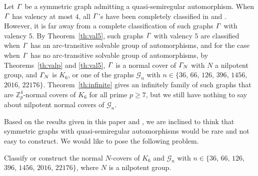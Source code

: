 \documentclass[12pt,reqno]{amsart}
\newcommand\mz{\mathbb{Z}}
\newcommand{\cG}{\mathcal{G}}
\numberwithin {equation} {section}
\begin{document}
Let ${\it \Gamma}$ be a symmetric graph admitting a quasi-semiregular automorphism. When ${\it \Gamma}$ has valency at most $4$, all ${\it \Gamma}$'s have been completely  classified in \cite{FengHKKM} and \cite{YF}. However, it is far away from a complete classification of such graphs ${\it \Gamma}$ with valency $5$. By Theorem~\ref{th:val5}, such graphs ${\it \Gamma}$ with valency $5$ are classified when ${\it \Gamma}$ has an arc-transitive solvable group of automorphisms, and for the case when ${\it \Gamma}$ has no arc-transitive solvable group of automorphisms, by Theorems~\ref{th:valp} and \ref{th:val5}, ${\it \Gamma}$ is a normal cover of ${\it \Gamma}_N$ with $N$ a nilpotent group, and ${\it \Gamma}_N$ is $K_6$, or one of the graphs $\cG_{n}$ with $n \in  \{36$, $66$, $126$, $396$, $1456$, $2016$, $22176\}$. Theorem~\ref{th:infinite} gives an infinitely family of such graphs that are $\mz_p^4$-normal covers of $K_6$ for all prime $p\geq 7$, but we still have nothing to say about nilpotent normal covers of $\cG_{n}$.

Based on the results given in this paper and \cite{FengHKKM,YF}, we are inclined to think that symmetric graphs with quasi-semiregular automorphisms would be rare and not easy to construct. We would like to pose the following problem.

\medskip
{} Classify or construct the normal $N$-covers of $K_6$ and $\cG_{n}$ with $n \in  \{36$, $66$, $126$, $396$, $1456$, $2016$, $22176\}$, where $N$ is a nilpotent group.
\end{document}
